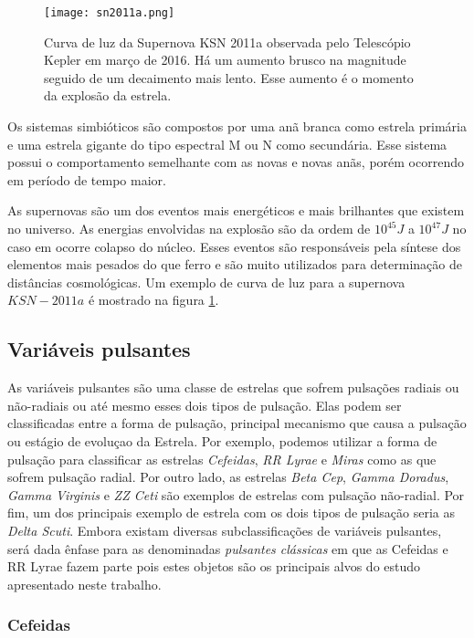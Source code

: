 \begin{figure}[ht!]
\centering
\texttt{[image: sn2011a.png]}
\caption[Curva de luz da Supernova KSN 2011a]{Curva de luz da Supernova KSN 2011a observada pelo Telescópio Kepler em março de 2016. Há um aumento brusco na magnitude seguido de um decaimento mais lento. Esse aumento é o momento da explosão da estrela.}
\label{fig:exemplo_sn}
\end{figure}

Os sistemas simbióticos são compostos por uma anã branca como estrela primária e uma estrela gigante do tipo espectral M ou N como secundária. Esse sistema possui o comportamento semelhante com as novas e novas anãs, porém ocorrendo em período de tempo maior.

As supernovas são um dos eventos mais energéticos e mais brilhantes que existem no universo. As energias envolvidas na explosão são da ordem de $10^{45} \si{J}$ a $10^{47} \si{J}$ no caso em ocorre colapso do núcleo. Esses eventos são responsáveis pela síntese dos elementos mais pesados do que ferro e são muito utilizados para determinação de distâncias cosmológicas. Um exemplo de curva de luz para a supernova $KSN-2011a$ é mostrado na figura \ref{fig:exemplo_sn}.

\subsection{Variáveis pulsantes}

As variáveis pulsantes são uma classe de estrelas que sofrem pulsações radiais ou não-radiais ou até mesmo esses dois tipos de pulsação. Elas podem ser classificadas entre a forma de pulsação, principal mecanismo que causa a pulsação ou estágio de evoluçao da Estrela. Por exemplo, podemos utilizar a forma de pulsação para classificar as estrelas \textit{Cefeidas}, \textit{RR Lyrae} e \textit{Miras} como as que sofrem pulsação radial. Por outro lado, as estrelas \textit{Beta Cep}, \textit{Gamma Doradus}, \textit{Gamma Virginis} e \textit{ZZ Ceti} são exemplos de estrelas com pulsação não-radial. Por fim, um dos principais exemplo de estrela com os dois tipos de pulsação seria as \textit{Delta Scuti}. Embora existam diversas subclassificações de variáveis pulsantes, será dada ênfase para as denominadas \textit{pulsantes clássicas} em que as Cefeidas e RR Lyrae fazem parte pois estes objetos são os principais alvos do estudo apresentado neste trabalho.

\subsubsection{Cefeidas}

